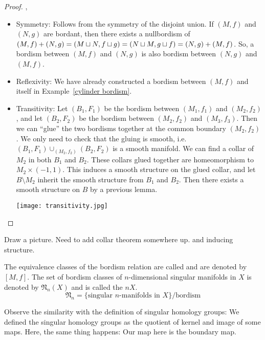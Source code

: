 \documentclass[a4paper,11pt]{article}
\begin{document}
\begin{proof}\cite{brocker}, \cite[p.8]{conner}
    \begin{itemize}
        \item Symmetry: Follows from the symmetry of the disjoint union. If \((M,f)\) and \((N,g)\) are bordant, then there exists a nullbordism of \((M,f)+(N,g)=(M\sqcup N, f\sqcup g) = (N\sqcup M, g\sqcup f) = (N,g)+ (M,f)\). So, a bordism between \((M,f)\) and \((N,g)\) is also bordism between \((N,g)\) and \((M,f)\).
        \item Reflexivity: We have already constructed a bordism between \((M,f)\) and itself in Example\ \ref{cylinder bordism}.
        \item Transitivity: Let \((B_1,F_1)\) be the bordism between \((M_1,f_1)\) and \((M_2,f_2)\), and let \((B_2,F_2)\) be the bordism between \((M_2,f_2)\) and \((M_3,f_3)\). Then we can \enquote{glue} the two bordisms together at the common boundary \((M_2,f_2)\). We only need to check that the gluing is smooth, i.e.\ \((B_1,F_1)\cup_{(M_2,f_2)}(B_2,F_2)\) is a smooth manifold. We can find a collar of \(M_2\) in both \(B_1\) and \(B_2\). These collars glued together are homeomorphism to \(M_2\times(-1,1)\). This induces a smooth structure on the glued collar, and let \(B\setminus M_2\) inherit the smooth structure from \(B_1\) and \(B_2\). Then there exists a smooth structure on \(B\) by a previous lemma.
        \begin{center}
            \texttt{[image: transitivity.jpg]}
        \end{center}
    \end{itemize}
\end{proof}
Draw a picture.
Need to add collar theorem somewhere up.
and inducing structure.

\begin{definition}
    The equivalence classes of the bordism relation are called  and are denoted by \([M,f]\).
    The set of bordism classes of \(n\)-dimensional singular manifolds in \(X\) is denoted by \(\mathfrak{N}_n(X)\) and is called the \(n\)\(X\).
    \[\mathfrak{N}_n=\{\text{singular \(n\)-manifolds in \(X\)}\}\big/\text{bordism}\]
\end{definition}

Observe the similarity with the definition of singular homology groups: We defined the singular homology groups as the quotient of kernel and image of some maps. Here, the same thing happens: Our map here is the boundary map.
\end{document}
